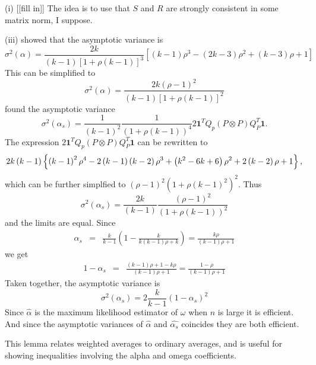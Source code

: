 \documentclass{article}
\makeatletter
\theoremstyle{plain}
\theoremstyle{plain}
\theoremstyle{definition}
\theoremstyle{remark}
\theoremstyle{definition}
\theoremstyle{plain}
\theoremstyle{plain}
\theoremstyle{definition}
\newenvironment{proof}[1][\protect\proofname]{\par
	\normalfont\topsep6\p@\@plus6\p@\relax
	\trivlist
	\itemindent\parindent
	\item[\hskip\labelsep\scshape #1]\ignorespaces
}{%
	\endtrivlist\@endpefalse
}
\providecommand{\proofname}{Proof}
\makeatother
\begin{document}
\begin{proof}[Proof of Theorem \ref{thm:asymptotics}]\label{proof:asymptotics}
(i) [[fill in]] The idea is to use that $S$ and $R$ are strongly consistent in some matrix norm, I suppose. 

(iii) \citet[eq. 22]{Van_Zyl2000-si} showed that the asymptotic variance
is
\[
\sigma^{2}\left(\alpha\right)=\frac{2k}{\left(k-1\right)\left[1+\rho\left(k-1\right)\right]^{3}}\left[\left(k-1\right)\rho^{3}-\left(2k-3\right)\rho^{2}+\left(k-3\right)\rho+1\right]
\]
This can be simplified to
\[
\sigma^{2}\left(\alpha\right)=\frac{2k\left(\rho-1\right)^{2}}{\left(k-1\right)\left[1+\rho\left(k-1\right)\right]^{2}}
\]
\citet[equation 10]{hayashi2005note} found the asymptotic variance
\[
\sigma^{2}\left(\alpha_{s}\right)=\frac{1}{\left(k-1\right)^{2}}\frac{1}{\left(1+\rho\left(k-1\right)\right)^{4}}2\mathbf{1}^{T}Q_{p}\left(P\otimes P\right)Q_{P}^{T}\mathbf{1}.
\]
The expression $2\mathbf{1}^{T}Q_{p}\left(P\otimes P\right)Q_{P}^{T}\mathbf{1}$
can be rewritten to \citep[appendix 3]{hayashi2005note}
\[
2k\left(k-1\right)\left\{ \left(k-1\right)^{2}\rho^{4}-2\left(k-1\right)\left(k-2\right)\rho^{3}+\left(k^{2}-6k+6\right)\text{\ensuremath{\rho^{2}+2\left(k-2\right)\rho+1}}\right\} ,
\]
which can be further simplfied to $\left(\rho-1\right)^{2}\left(1+\rho\left(k-1\right)^{2}\right)^{2}$.
Thus
\[
\sigma^{2}\left(\alpha_{s}\right)=\frac{2k}{\left(k-1\right)}\frac{\left(\rho-1\right)^{2}}{\left(1+\rho\left(k-1\right)\right)^{2}}
\]
and the limits are equal.
Since
\begin{eqnarray*}
\alpha_{s} & = & \frac{k}{k-1}\left(1-\frac{k}{k\left(k-1\right)\rho+k}\right) = \frac{k\rho}{\left(k-1\right)\rho+1}
\end{eqnarray*}
we get
\begin{eqnarray*}
1-\alpha_{s} & = & \frac{\left(k-1\right)\rho+1-k\rho}{\left(k-1\right)\rho+1} = \frac{1-\rho}{\left(k-1\right)\rho+1}
\end{eqnarray*}
Taken together, the asymptotic variance is
\[
\sigma^{2}\left(\alpha_{s}\right)=2\frac{k}{k-1}\left(1-\alpha_{s}\right)^{2}
\]
Since $\widehat{\alpha}$ is the maximum likelihood estimator of $\omega$
when $n$ is large it is efficient. And since the asymptotic variances
of $\widehat{\alpha}$ and $\widehat{\alpha_{s}}$ coincides they
are both efficient.
\end{proof}

This lemma relates weighted averages to ordinary averages, and is useful for showing inequalities involving the alpha and omega coefficients.
\end{document}
